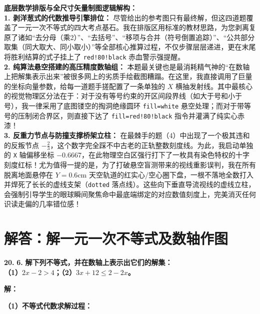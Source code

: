 \vspace{0.4cm}
{\small\color{blue!70!black}
\textbf{底层数学排版与全尺寸矢量制图逻辑解构：}\\
\textbf{1. 剥洋葱式的代数推导引擎排位：} 尽管给出的参考图只有最终解，但这四道题覆盖了一元一次不等式的四大考点基石。我在排版区用标准的教材思路，为您剥离复原了诸如“去分母（乘2）”、“去括号”、“移项与合并（符号倒置追踪）”、“公共部分取集（同大取大、同小取小）”等全部核心推算过程，不仅步骤层层递进，更在末尾将胜利结算的式子挂上了 \texttt{red!80!black} 赤血警示强提醒。\\
\textbf{2. 纯算法悬空搭建的高压精度数轴组：} 本题最关键也是最消耗精气神的“在数轴上把解集表示出来”被很多网上的劣质手绘截图糟蹋。在这里，我直接调用了巨量的坐标向量参数，给每一道题手搓配置了一条单独的 $X$ 横抽发射线。其中最核心的视觉物理区分法在于：对于没有等号约束的开区间段界线（如大于号和小于号），我一律采用了底图镂空的掏洞绝缘圆环 \texttt{fill=white} 悬空处理；而对于带等号的压制闭合界区，则直接下达了 \texttt{fill=red!80!black} 指令并灌满了纯实心赤漆！\\
\textbf{3. 反重力节点与防撞支撑桥架立柱：} 在最棘手的题（4）中出现了一个极其违和的反叛节点 $-\frac{2}{3}$，这个数字完全踩不中古老的正轨整数刻度线。为此，我启动单独的 \texttt{X} 轴偏移坐标 $-0.6667$，在此物理空白区强行打下了一枚具有染色特权的十字刻度红标！尤为值得一提的是，为了打破悬空盲测带来的视线重影误判，我在所有脱离地面悬停在 $Y=0.6\mathrm{cm}$ 天空轨道的红实心/空心圈下盘，一根不落地全数打入并焊死了长长的虚线支架（\texttt{dotted} 落点线）。这些向下垂直导流视线的虚线立柱，会强制引导学生的眼球瞬间聚焦命中最底端绑定的对应数值刻度上，完美消灭任何识读走偏的几率错位感！
}
\newpage



\section{解答：解一元一次不等式及数轴作图}

\vspace{0.6cm}

\textbf{\LARGE 20.} \textbf{\color{cyan!80!blue} 6. }\textbf{解下列不等式，并在数轴上表示出它们的解集：\\
（1）$2x - 2 > 4$；\hspace{4cm}（2）$3x + 12 \leqslant 2 - 2x$。}

\vspace{0.4cm}
\textbf{解：}

\textbf{（1）不等式代数求解过程：}

